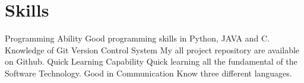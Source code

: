\documentclass[]{cv-style}
\begin{document}

\section{Skills}
  \vspace{-0.2cm}

\begin{entrylist}

\entry{}
  {Programming Ability}
{}
{\jobtitle{}Good programming skills in Python, JAVA and C.}
\entry{}
{Knowledge of Git Version Control System}{}
{\jobtitle{}My all project repository are available on Github. }
\entry{}
  {Quick Learning Capability }
  {}
  {\jobtitle{}Quick learning all the fundamental of the Software Technology.}
  \entry
  {}
  {Good in Communication}
  {}
  {\jobtitle{}Know three different languages. }


  

\end{entrylist}
\end{document}
